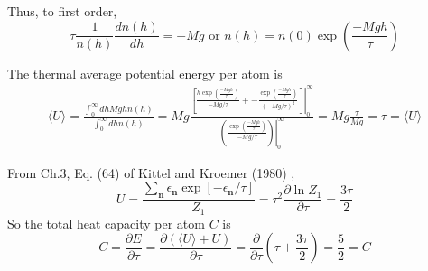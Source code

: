 Thus, to first order,
\[
\tau \frac{1}{n(h) } \frac{ dn(h) }{dh} = -Mg \text{ or } n(h) = n(0) \exp{ \left( \frac{-Mgh}{\tau} \right) }
\]

The thermal average potential energy per atom is 
\[
\begin{gathered}
  \langle U \rangle = \frac{ \int_0^{\infty} dh Mgh n(h) }{ \int_0^{\infty} dh n(h) } = Mg \frac{ \left. \left[ \frac{ h \exp{ \left( \frac{-Mgh}{\tau} \right) } }{ -Mg/\tau } + - \frac{ \exp{ \left( \frac{-Mgh}{\tau} \right) } }{ (-Mg/\tau)^2 } \right] \right|_0^{\infty} }{ \left. \left( \frac{ \exp{ \left( \frac{-Mgh}{\tau } \right) } }{ -Mg/\tau} \right) \right|_0^{\infty} } = Mg \frac{\tau}{Mg} = \boxed{ \tau = \langle U \rangle }
\end{gathered}
\]

From Ch.3, Eq. (64) of Kittel and Kroemer (1980) \cite{CKittelHKroemer1980}, 
\[
U = \frac{ \sum_{\mathbf{n}} \epsilon_{\mathbf{n}} \exp{ \left[ -\epsilon_{\mathbf{n}} /\tau \right] } }{Z_1} = \tau^2 \frac{ \partial \ln{Z_1}}{\partial \tau } = \frac{3\tau}{2}
\]
So the total heat capacity per atom $C$ is 
\[
C = \frac{ \partial E}{ \partial \tau} = \frac{ \partial ( \langle U \rangle + U ) }{ \partial \tau } = \frac{ \partial }{ \partial \tau} ( \tau + \frac{3\tau}{2} ) = \boxed{ \frac{5}{2}  = C}
\]


